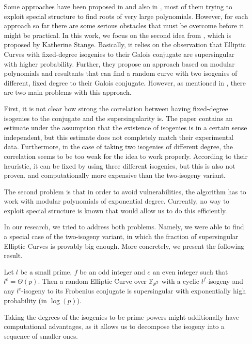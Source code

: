 Some approaches have been proposed in \cite{base_paper} and also in \cite{concurrent_paper}, most of them trying to exploit special structure to find roots of very large polynomials.
However, for each approach so far there are some serious obstacles that must be overcome before it might be practical.
In this work, we focus on the second idea from \cite{base_paper}, which is proposed by Katherine Stange.
Basically, it relies on the observation that Elliptic Curves with fixed-degree isogenies to their Galois conjugate are supersingular with higher probability.
Further, they propose an approach based on modular polynomials and resultants that can find a random curve with two isogenies of different, fixed degree to their Galois conjugate.
However, as mentioned in \cite{base_paper}, there are two main problems with this approach.

First, it is not clear how strong the correlation between having fixed-degree isogenies to the conjugate and the supersingularity is.
The paper contains an estimate under the assumption that the existence of isogenies is in a certain sense independent, but this estimate does not completely match their experimental data.
Furthermore, in the case of taking two isogenies of different degree, the correlation seems to be too weak for the idea to work properly.
According to their heuristic, it can be fixed by using three different isogenies, but this is also not proven, and computationally more expensive than the two-isogeny variant.

The second problem is that in order to avoid vulnerabilities, the algorithm has to work with modular polynomials of exponential degree.
Currently, no way to exploit special structure is known that would allow us to do this efficiently.

In our research, we tried to address both problems.
Namely, we were able to find a special case of the two-isogeny variant, in which the fraction of supersingular Elliptic Curves is provably big enough.
More concretely, we present the following result.
\begin{prop}
    \label{prop:main_result1}
    Let $l$ be a small prime, $f$ be an odd integer and $e$ an even integer such that $l^e = \Theta(p)$.
    Then a random Elliptic Curve over $\mathbb{F}_{p^2}$ with a cyclic $l^f$-isogeny and any $l^e$-isogeny to its Frobenius conjugate is supersingular with exponentially high probability (in $\log(p)$).
\end{prop}
Taking the degrees of the isogenies to be prime powers might additionally have computational advantages, as it allows us to decompose the isogeny into a sequence of smaller ones.

